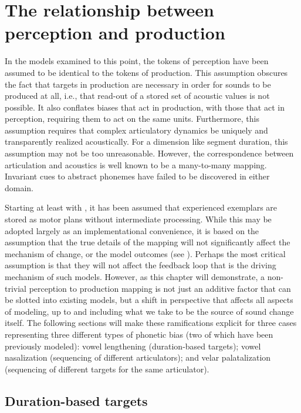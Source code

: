 \chapter{The relationship between perception and production}\label{ch:Perception-Production}

In the models examined to this point, the tokens of perception have
been assumed to be identical to the tokens of production. This assumption
obscures the fact that targets in production are necessary in order
for sounds to be produced at all, i.e., that read-out of a stored
set of acoustic values is not possible. It also conflates biases that
act in production, with those that act in perception, requiring them
to act on the same units. Furthermore, this assumption requires that
complex articulatory dynamics be uniquely and transparently realized
acoustically. For a dimension like segment duration, this assumption
may not be too unreasonable. However, the correspondence between articulation
and acoustics is well known to be a many-to-many mapping. Invariant
cues to abstract phonemes have failed to be discovered in either domain. 

Starting at least with \citet{Goldinger1996}, it has been assumed
that experienced exemplars are stored as motor plans without intermediate
processing. While this may be adopted largely as an implementational
convenience, it is based on the assumption that the true details of
the mapping will not significantly affect the mechanism of change,
or the model outcomes (see \citealt{Pierrehumbert2000}). Perhaps
the most critical assumption is that they will not affect the feedback
loop that is the driving mechanism of such models. However, as this
chapter will demonstrate, a non-trivial perception to production mapping
is not just an additive factor that can be slotted into existing models,
but a shift in perspective that affects all aspects of modeling, up
to and including what we take to be the source of sound change itself.
The following sections will make these ramifications explicit for
three cases representing three different types of phonetic bias (two
of which have been previously modeled): vowel lengthening (duration-based
targets); vowel nasalization (sequencing of different articulators);
and velar palatalization (sequencing of different targets for the
same articulator). 

\section{Duration-based targets}

